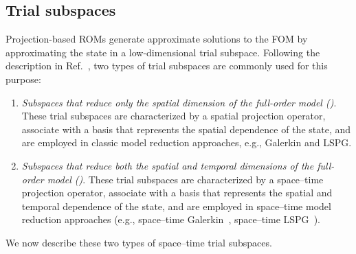 \documentclass[3p,computermodern,10pt]{elsarticle}
\begin{document}
 \subsection{Trial subspaces}
Projection-based ROMs generate approximate solutions to the FOM
 by approximating the state in a low-dimensional trial
	subspace. Following the description in Ref.~\cite{parish_wls}, two types of trial subspaces are commonly used for
	this purpose:
\begin{enumerate} 
	\item \textit{Subspaces that reduce only the spatial dimension of the full-order
		model (\spatialAcronym)}. These trial subspaces are characterized by a spatial projection operator, associate with a basis that represents the spatial dependence of the state, and are employed in classic model reduction approaches, e.g., Galerkin and LSPG. %
	\item \textit{Subspaces that reduce both the spatial and temporal dimensions of the full-order
		model (\spaceTimeAcronym)}.
These trial subspaces are characterized by a space--time projection operator, associate with a basis that represents the spatial and temporal dependence of the state, and are employed in space--time 
model reduction approaches (e.g., space--time Galerkin~\cite{benner_st}, space--time LSPG~\cite{choi_stlspg}). 
\end{enumerate}
 We now describe these two types of space--time trial subspaces.%
\end{document}
